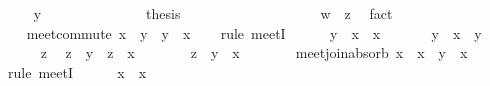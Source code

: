 \begin{isabellebody}
\ \isamarkupfalse%
\ {\isachardoublequoteopen}{\isasymdots}\ {\isasymsqsubseteq}\ y{\isachardoublequoteclose}\ \isacommand{{\isachardot}{\isachardot}}\isamarkupfalse%
\isanewline
\ \ \ \ \ \ \ \ \ \ \isamarkupfalse%
\ \isamarkupfalse%
\ {\isacharquery}thesis\ \isacommand{{\isachardot}}\isamarkupfalse%
\isanewline
\ \ \ \ \ \ \ \ \isamarkupfalse%
\isanewline
\ \ \ \ \ \ \ \ \isamarkupfalse%
\ {\isachardoublequoteopen}w\ {\isasymsqsubseteq}\ z{\isachardoublequoteclose}\ \isamarkupfalse%
\ fact\isanewline
\ \ \ \ \ \ \isamarkupfalse%
\isanewline
\ \ \ \ \isamarkupfalse%
\isanewline
\ \ \isamarkupfalse%
\isanewline
\isanewline
\ \ \isamarkupfalse%
\ meet{\isacharunderscore}commute{\isacharcolon}\ {\isachardoublequoteopen}x\ {\isasymsqinter}\ y\ {\isacharequal}\ y\ {\isasymsqinter}\ x{\isachardoublequoteclose}\isanewline
\ \ \isamarkupfalse%
\ {\isacharparenleft}rule\ meetI{\isacharparenright}\isanewline
\ \ \ \ \isamarkupfalse%
\ {\isachardoublequoteopen}y\ {\isasymsqinter}\ x\ {\isasymsqsubseteq}\ x{\isachardoublequoteclose}\ \isacommand{{\isachardot}{\isachardot}}\isamarkupfalse%
\isanewline
\ \ \ \ \isamarkupfalse%
\ {\isachardoublequoteopen}y\ {\isasymsqinter}\ x\ {\isasymsqsubseteq}\ y{\isachardoublequoteclose}\ \isacommand{{\isachardot}{\isachardot}}\isamarkupfalse%
\isanewline
\ \ \ \ \isamarkupfalse%
\ z\ \isamarkupfalse%
\ {\isachardoublequoteopen}z\ {\isasymsqsubseteq}\ y{\isachardoublequoteclose}\ \ {\isachardoublequoteopen}z\ {\isasymsqsubseteq}\ x{\isachardoublequoteclose}\isanewline
\ \ \ \ \isamarkupfalse%
\ \isamarkupfalse%
\ {\isachardoublequoteopen}z\ {\isasymsqsubseteq}\ y\ {\isasymsqinter}\ x{\isachardoublequoteclose}\ \isacommand{{\isachardot}{\isachardot}}\isamarkupfalse%
\isanewline
\ \ \isamarkupfalse%
\isanewline
\isanewline
\ \ \isamarkupfalse%
\ meet{\isacharunderscore}join{\isacharunderscore}absorb{\isacharcolon}\ {\isachardoublequoteopen}x\ {\isasymsqinter}\ {\isacharparenleft}x\ {\isasymsqunion}\ y{\isacharparenright}\ {\isacharequal}\ x{\isachardoublequoteclose}\isanewline
\ \ \isamarkupfalse%
\ {\isacharparenleft}rule\ meetI{\isacharparenright}\isanewline
\ \ \ \ \isamarkupfalse%
\ {\isachardoublequoteopen}x\ {\isasymsqsubseteq}\ x{\isachardoublequoteclose}\ \isacommand{{\isachardot}{\isachardot}}\isamarkupfalse%

\end{isabellebody}
